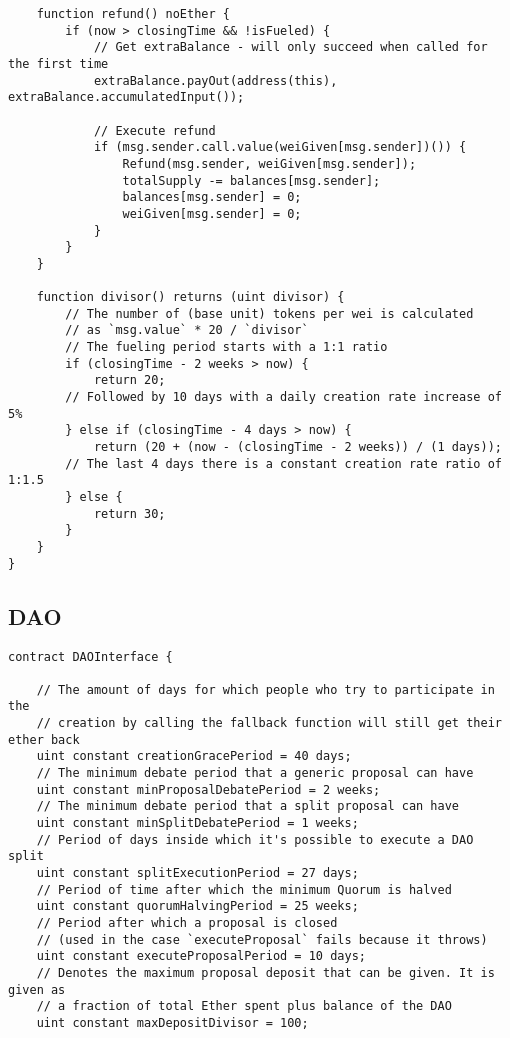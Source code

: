 \documentclass[9pt,oneside]{amsart}
\begin{document}
\begin{appendix}
\begin{verbatim}
    function refund() noEther {
        if (now > closingTime && !isFueled) {
            // Get extraBalance - will only succeed when called for the first time
            extraBalance.payOut(address(this), extraBalance.accumulatedInput());

            // Execute refund
            if (msg.sender.call.value(weiGiven[msg.sender])()) {
                Refund(msg.sender, weiGiven[msg.sender]);
                totalSupply -= balances[msg.sender];
                balances[msg.sender] = 0;
                weiGiven[msg.sender] = 0;
            }
        }
    }

    function divisor() returns (uint divisor) {
        // The number of (base unit) tokens per wei is calculated
        // as `msg.value` * 20 / `divisor`
        // The fueling period starts with a 1:1 ratio
        if (closingTime - 2 weeks > now) {
            return 20;
        // Followed by 10 days with a daily creation rate increase of 5%
        } else if (closingTime - 4 days > now) {
            return (20 + (now - (closingTime - 2 weeks)) / (1 days));
        // The last 4 days there is a constant creation rate ratio of 1:1.5
        } else {
            return 30;
        }
    }
}
\end{verbatim}
\subsection{DAO}\label{app:DAO}
\begin{verbatim}
contract DAOInterface {

    // The amount of days for which people who try to participate in the
    // creation by calling the fallback function will still get their ether back
    uint constant creationGracePeriod = 40 days;
    // The minimum debate period that a generic proposal can have
    uint constant minProposalDebatePeriod = 2 weeks;
    // The minimum debate period that a split proposal can have
    uint constant minSplitDebatePeriod = 1 weeks;
    // Period of days inside which it's possible to execute a DAO split
    uint constant splitExecutionPeriod = 27 days;
    // Period of time after which the minimum Quorum is halved
    uint constant quorumHalvingPeriod = 25 weeks;
    // Period after which a proposal is closed
    // (used in the case `executeProposal` fails because it throws)
    uint constant executeProposalPeriod = 10 days;
    // Denotes the maximum proposal deposit that can be given. It is given as
    // a fraction of total Ether spent plus balance of the DAO
    uint constant maxDepositDivisor = 100;


\end{verbatim}
\end{appendix}
\end{document}
